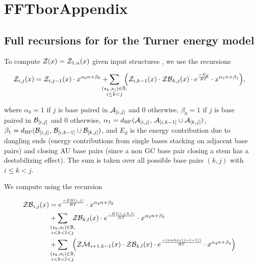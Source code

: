 
\chapter{FFTbor\twoD Appendix}
\label{ch:ffttwoapp}


\section{Full recursions for \texorpdfstring{}{}
for the Turner energy model}
\label{sec:ffttwo:turner}

To compute ${\mathcal Z}_{}(x) = {\mathcal Z}_{1,n}(x)$ given input structures \strAB,
we use the recursions

\begin{align}
\label{eq:ffttwoapp:zx}
\emZ{i,j} = \emZ{i,j-1} \cdot x^{\ab{0}} +
\sum_{\mathclap{\substack{(s_k,s_j) \in \bpSet, \\ i \leq k < j}}}\enspace
\Big( \emZ{i,k-1} \cdot \emZB{k,j} \cdot \boltzE{E_d} \cdot
x^{\ab{1}} \Big),
\end{align}

where
$\alpha_0 = 1$ if $j$ is base paired in $\mathcal A_{[i,j]}$ and $0$ otherwise,
$\beta_0 = 1$ if $j$ is base paired in $\mathcal B_{[i,j]}$ and $0$ otherwise,
$\alpha_1 = d_{\text{BP}}(\mathcal A_{[i,j]},\,\mathcal A_{[i,k-1]} \cup \mathcal A_{[k,j]})$,
$\beta_1 = d_{\text{BP}}(\mathcal B_{[i,j]},\,\mathcal B_{[i,k-1]} \cup \mathcal B_{[k,j]})$,
and $E_d$ is the energy contribution due to dangling ends (energy
contributions from single bases stacking on adjacent base pairs) and
closing AU base pairs (since a non GC base pair closing a stem has a
destabilizing effect).  The sum is taken over all possible
base pairs $(k,j)$ with $i \leq k < j$.

We compute \emZB{} using the recursion

\begin{align}
\label{eq:ffttwoapp:zbx}
\begin{split}
\emZB{i,j} &= \boltzE{EH(i,j)} \cdot x^{\ab{2}} \\
&+ \sum_{\mathclap{\substack{(s_k,s_l) \in \bpSet, \\ i < k < l < j }}}\enspace
\emZB{k,l} \cdot \boltzE{EI(i,j,k,l)} \cdot x^{\ab{3}} \\
&+ \sum_{\mathclap{\substack{(s_k,s_l) \in \bpSet, \\ i < k < l < j }}}\enspace
\Big( \emZM{i+1,k-1} \cdot \emZB{k,l} \cdot \boltzE{(a+b+c(j-l-1))}
\cdot x^{\ab{4}} \Big)
\end{split}
\end{align}

